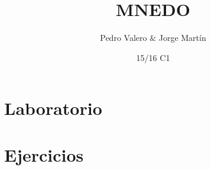 \documentclass{apuntes}
\title{MNEDO}
\author{Pedro Valero \& Jorge Martín}
\date{15/16 C1}
\begin{document}
\pagestyle{plain}
\maketitle

\tableofcontents





\chapter{Laboratorio}

\appendix

\chapter{Ejercicios}

\printindex
\end{document}
